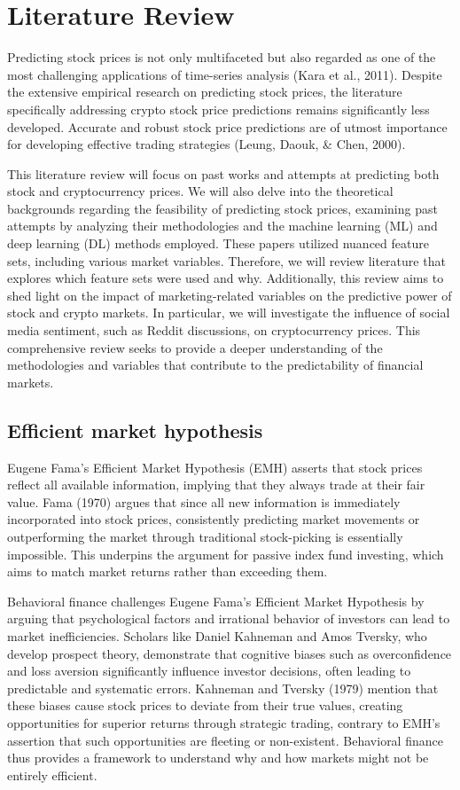 \chapter{Literature Review}

Predicting stock prices is not only multifaceted but also regarded as one of the most challenging applications of time-series analysis (Kara et al., 2011). Despite the extensive empirical research on predicting stock prices, the literature specifically addressing crypto stock price predictions remains significantly less developed. Accurate and robust stock price predictions are of utmost importance for developing effective trading strategies (Leung, Daouk, \(
\)\& Chen, 2000).

This literature review will focus on past works and attempts at predicting both stock and cryptocurrency prices. We will also delve into the theoretical backgrounds regarding the feasibility of predicting stock prices, examining past attempts by analyzing their methodologies and the machine learning (ML) and deep learning (DL) methods employed. These papers utilized nuanced feature sets, including various market variables. Therefore, we will review literature that explores which feature sets were used and why.
Additionally, this review aims to shed light on the impact of marketing-related variables on the predictive power of stock and crypto markets. In particular, we will investigate the influence of social media sentiment, such as Reddit discussions, on cryptocurrency prices. This comprehensive review seeks to provide a deeper understanding of the methodologies and variables that contribute to the predictability of financial markets.

\section{Efficient market hypothesis}

Eugene Fama's Efficient Market Hypothesis (EMH) asserts that stock prices reflect all available information, implying that they always trade at their fair value. Fama (1970) argues that since all new information is immediately incorporated into stock prices, consistently predicting market movements or outperforming the market through traditional stock-picking is essentially impossible. This underpins the argument for passive index fund investing, which aims to match market returns rather than exceeding them.

Behavioral finance challenges Eugene Fama's Efficient Market Hypothesis by arguing that psychological factors and irrational behavior of investors can lead to market inefficiencies. Scholars like Daniel Kahneman and Amos Tversky, who develop prospect theory, demonstrate that cognitive biases such as overconfidence and loss aversion significantly influence investor decisions, often leading to predictable and systematic errors. Kahneman and Tversky (1979) mention that these biases cause stock prices to deviate from their true values, creating opportunities for superior returns through strategic trading, contrary to EMH’s assertion that such opportunities are fleeting or non-existent. Behavioral finance thus provides a framework to understand why and how markets might not be entirely efficient.

